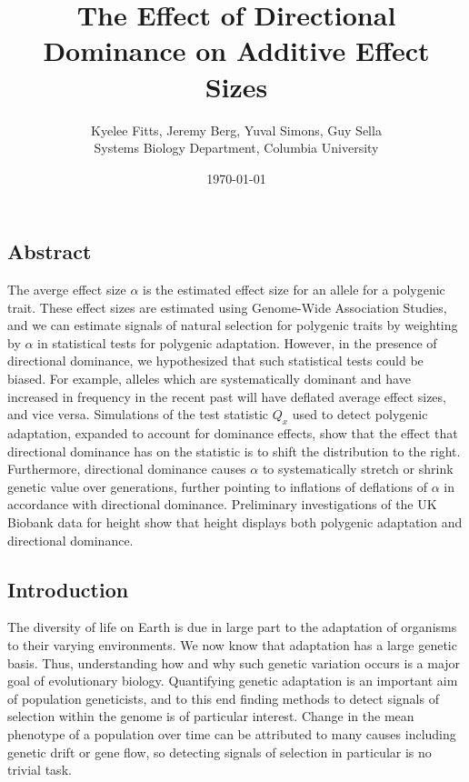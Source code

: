 \documentclass[a4paper,12pt]{article}
\begin{document}
\title{\vspace{-2cm}
  The Effect of Directional Dominance on Additive Effect Sizes
}
\author{\normalsize{Kyelee Fitts, Jeremy Berg, Yuval Simons, Guy
    Sella \\
  \small{Systems Biology Department, Columbia University}}}
\date{\normalsize{\today}}
\maketitle



\subsection*{Abstract}
The averge effect size $\alpha$ is the estimated effect size for an
allele for a polygenic trait. These effect sizes are estimated using
Genome-Wide Association Studies, and we can estimate signals of natural
selection for polygenic traits by weighting by $\alpha$ in statistical
tests for polygenic adaptation. However, in the presence of
directional dominance, we hypothesized that such statistical tests
could be biased. For example, alleles which are systematically
dominant and have increased in frequency in the recent past will have
deflated average effect sizes, and vice versa. Simulations of the test
statistic $Q_x$ used to detect polygenic adaptation, expanded to
account for dominance effects, show that the effect that directional
dominance has on the statistic is to shift the distribution to the
right. Furthermore, directional dominance causes $\alpha$ to
systematically stretch or shrink genetic value over generations,
further pointing to inflations of deflations of $\alpha$ in accordance
with directional dominance. Preliminary investigations of the UK
Biobank data for height show that height displays both polygenic
adaptation and directional dominance.


\subsection*{Introduction}

The diversity of life on Earth is due in large part to the
adaptation of organisms to their varying environments. We now know that
adaptation has a large genetic basis. Thus, understanding how and why such
genetic variation occurs is a major goal of evolutionary
biology. Quantifying genetic adaptation is an important aim of population
geneticists, and to this end finding methods to detect signals of
selection within the genome is of particular interest. Change in the
mean phenotype of a population over time can be attributed to many causes including genetic
drift or gene flow, so detecting signals of selection in
particular is no trivial task.
\end{document}
